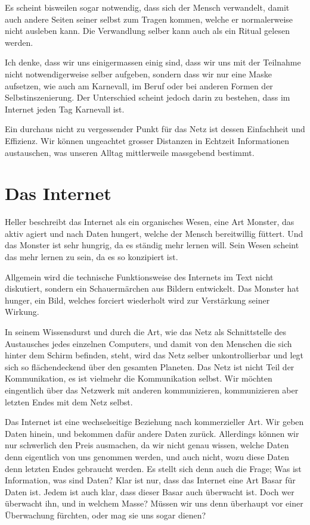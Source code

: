 \documentclass[a4paper,ngerman,11pt]{scrartcl}
\begin{document}
Es scheint bisweilen sogar notwendig, dass sich der Mensch verwandelt, damit
auch andere Seiten seiner selbst zum Tragen kommen, welche er normalerweise
nicht ausleben kann. Die Verwandlung selber kann auch als ein Ritual gelesen
werden.

Ich denke, dass wir uns einigermassen einig sind, dass wir uns mit der
Teilnahme nicht notwendigerweise selber aufgeben, sondern dass wir nur eine
Maske aufsetzen, wie auch am Karnevall, im Beruf oder bei anderen Formen der
Selbstinszenierung. Der Unterschied scheint jedoch darin zu bestehen, dass im
Internet jeden Tag Karnevall ist.

Ein durchaus nicht zu vergessender Punkt für das Netz ist dessen Einfachheit
und Effizienz. Wir können ungeachtet grosser Distanzen in Echtzeit
Informationen austauschen, was unseren Alltag mittlerweile massgebend
bestimmt.

\section{Das Internet}
\label{sec-3}

Heller beschreibt das Internet als ein organisches Wesen, eine Art Monster,
das aktiv agiert und nach Daten hungert, welche der Mensch bereitwillig
füttert. Und das Monster ist sehr hungrig, da es ständig mehr lernen
will. Sein Wesen scheint das mehr lernen zu sein, da es so konzipiert ist.

Allgemein wird die technische Funktionsweise des Internets im Text nicht
diskutiert, sondern ein Schauermärchen aus Bildern entwickelt. Das Monster hat
hunger, ein Bild, welches forciert wiederholt wird zur Verstärkung seiner
Wirkung.

In seinem Wissensdurst und durch die Art, wie das Netz als Schnittstelle des
Austausches jedes einzelnen Computers, und damit von den Menschen die sich
hinter dem Schirm befinden, steht, wird das Netz selber unkontrollierbar und
legt sich so flächendeckend über den gesamten Planeten. Das Netz ist nicht
Teil der Kommunikation, es ist vielmehr die Kommunikation selbst. Wir möchten
eingentlich über das Netzwerk mit anderen kommunizieren, kommunizieren aber
letzten Endes mit dem Netz selbst.

Das Internet ist eine wechselseitige Beziehung nach kommerzieller Art. Wir
geben Daten hinein, und bekommen dafür andere Daten zurück. Allerdings können
wir nur schwerlich den Preis ausmachen, da wir nicht genau wissen, welche
Daten denn eigentlich von uns genommen werden, und auch nicht, wozu diese
Daten denn letzten Endes gebraucht werden. Es stellt sich denn auch die Frage;
Was ist Information, was sind Daten? Klar ist nur, dass das Internet eine Art
Basar für Daten ist. Jedem ist auch klar, dass dieser Basar auch überwacht
ist. Doch wer überwacht ihn, und in welchem Masse? Müssen wir uns denn
überhaupt vor einer Überwachung fürchten, oder mag sie uns sogar dienen?
\end{document}

